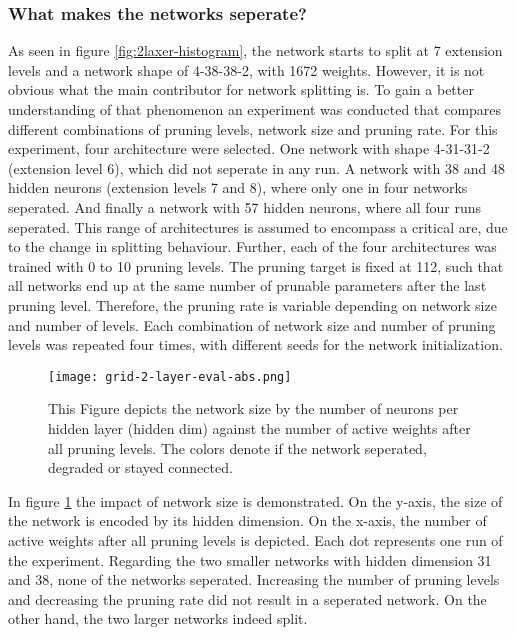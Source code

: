 \subsubsection{What makes the networks seperate?}
As seen in figure \ref{fig:2laxer-histogram}, the network starts to split at 7 extension levels and a network shape of 4-38-38-2, with 1672 weights.
However, it is not obvious what the main contributor for network splitting is.
To gain a better understanding of that phenomenon an experiment was conducted that compares different combinations of pruning levels, network size and pruning rate.
For this experiment, four architecture were selected.
One network with shape 4-31-31-2 (extension level 6), which did not seperate in any run.
A network with 38 and 48 hidden neurons (extension levels 7 and 8), where only one in four networks seperated.
And finally a network with 57 hidden neurons, where all four runs seperated.
This range of architectures is assumed to encompass a critical are, due to the change in splitting behaviour.
Further, each of the four architectures was trained with 0 to 10 pruning levels.
The pruning target is fixed at 112, such that all networks end up at the same number of prunable parameters after the last pruning level.
Therefore, the pruning rate is variable depending on network size and number of levels.
Each combination of network size and number of pruning levels was repeated four times, with different seeds for the network initialization.

\begin{figure}[ht]
    \centering
    \texttt{[image: grid-2-layer-eval-abs.png]}
    \caption{This Figure depicts the network size by the number of neurons per hidden layer (hidden dim) against the number of active weights after all pruning levels.
    The colors denote if the network seperated, degraded or stayed connected.}
    \label{fig:grid-1}
\end{figure}

In figure \ref{fig:grid-1} the impact of network size is demonstrated.
On the y-axis, the size of the network is encoded by its hidden dimension.
On the x-axis, the number of active weights after all pruning levels is depicted.
Each dot represents one run of the experiment.
Regarding the two smaller networks with hidden dimension 31 and 38, none of the networks seperated. 
Increasing the number of pruning levels and decreasing the pruning rate did not result in a seperated network.
On the other hand, the two larger networks indeed split.

